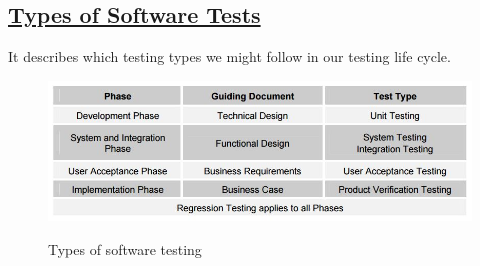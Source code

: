 \subsection*{\underline{Types of Software Tests}}
It describes which testing types we might follow in our testing life cycle.
    \begin{figure}[H]
        \centering
            \includegraphics[scale=0.65]{SoftwareTesting.JPG}\\
        \caption{Types of software testing}
  \end{figure}

